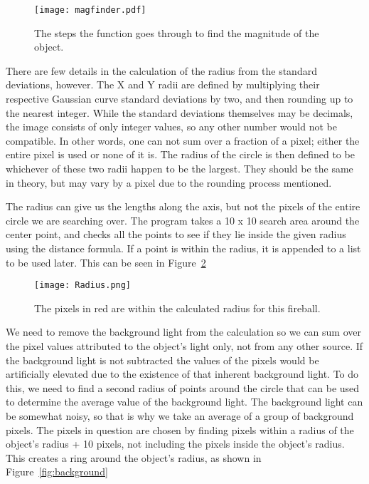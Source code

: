 \begin{figure}[htpb]
	\centering
	\texttt{[image: magfinder.pdf]}
	\caption{The steps the function goes through to find the magnitude of the object.}
	\label{fig:magfinder}
\end{figure}


There are few details in the calculation of the radius from the standard deviations, however. The X and Y radii are defined by multiplying their respective Gaussian curve standard deviations by two, and then rounding up to the nearest integer. While the standard deviations themselves may be decimals, the image consists of only integer values, so any other number would not be compatible. In other words, one can not sum over a fraction of a pixel; either the entire pixel is used or none of it is. The radius of the circle is then defined to be whichever of these two radii happen to be the largest. They should be the same in theory, but may vary by a pixel due to the rounding process mentioned. 

The radius can give us the lengths along the axis, but not the pixels of the entire circle we are searching over. The program takes a 10 x 10 search area around the center point, and checks all the points to see if they lie inside the given radius using the distance formula. If a point is within the radius, it is appended to a list to be used later. This can be seen in Figure~\ref{fig:radius}

\begin{figure}[ht!]
	\centering
	\texttt{[image: Radius.png]}
	\caption{The pixels in red are within the calculated radius for this fireball.}
	\label{fig:radius}
\end{figure}

We need to remove the background light from the calculation so we can sum over the pixel values attributed to the object's light only, not from any other source. If the background light is not subtracted the values of the pixels would be artificially elevated due to the existence of that inherent background light. To do this, we need to find a second radius of points around the circle that can be used to determine the average value of the background light. The background light can be somewhat noisy, so that is why we take an average of a group of background pixels. The pixels in question are chosen by finding pixels within a radius of the object's radius + 10 pixels, not including the pixels inside the object's radius. This creates a ring around the object's radius, as shown in Figure~\ref{fig:background}

